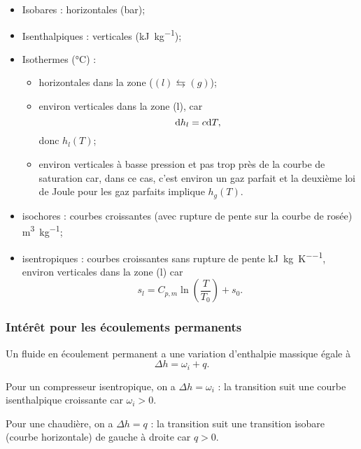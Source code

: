             \begin{itemize}
                \item Isobares : horizontales (\si[]{\bar});
                \item Isenthalpiques : verticales (\si[]{\kilo\joule\per\kilogram});
                \item Isothermes (\si[]{\celsius}) : 
                \begin{itemize}
                    \item horizontales dans la zone ($(l)\leftrightarrows (g)$);
                    \item environ verticales dans la zone (l), car
                    \begin{equation*}
                        \mathrm{d} h_l=c\mathrm{d} T,
                    \end{equation*}
                    donc $h_l(T)$;
                    \item environ verticales à basse pression et pas trop près de la courbe de saturation car, dans ce cas, c'est environ un gaz parfait et la deuxième loi de Joule pour les gaz parfaits implique $h_g(T)$.
                \end{itemize}
                \item isochores : courbes croissantes (avec rupture de pente sur la courbe de rosée) \si[]{\metre\cubed\per\kilogram};
                \item isentropiques : courbes croissantes sans rupture de pente \si[]{\kilo\joule\per\kilogram\per\kelvin}, environ verticales dans la zone (l) car 
                \begin{equation*}
                    s_l=C_{p,m}\ln\left(\frac{T}{T_0}\right)+s_0.
                \end{equation*}
            \end{itemize}

        \subsubsection{Intérêt pour les écoulements permanents}

            Un fluide en écoulement permanent a une variation d'enthalpie massique égale à 
            \begin{equation*}
                \Delta h=\omega_i+q.
            \end{equation*}
            \begin{example}
                Pour un compresseur isentropique, on a $\Delta h=\omega_i$ : la transition suit une courbe isenthalpique croissante car $\omega_i>0$.
            \end{example}
            \begin{example}
                Pour une chaudière, on a $\Delta h=q$ : la transition suit une transition isobare (courbe horizontale) de gauche à droite car $q>0$.
            \end{example}

